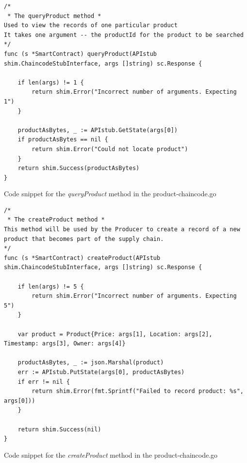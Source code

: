 \documentclass[
  a4paper,  %
  twoside,  %
  bibliography=totoc,
  headsepline,
  cleardoublepage=empty,
  parskip=half,
  draft=false
]{scrbook}
\begin{document}

\begin{Listing}[h!]
\begin{lstlisting}
/*
 * The queryProduct method *
Used to view the records of one particular product
It takes one argument -- the productId for the product to be searched
*/
func (s *SmartContract) queryProduct(APIstub shim.ChaincodeStubInterface, args []string) sc.Response {

	if len(args) != 1 {
		return shim.Error("Incorrect number of arguments. Expecting 1")
	}

	productAsBytes, _ := APIstub.GetState(args[0])
	if productAsBytes == nil {
		return shim.Error("Could not locate product")
	}
	return shim.Success(productAsBytes)
}
\end{lstlisting}
\caption{Code snippet for the \textit{queryProduct} method in the product-chaincode.go}
\label{lst:queryPId}
\end{Listing}
\begin{Listing}[h!]
\begin{lstlisting}
/*
 * The createProduct method *
This method will be used by the Producer to create a record of a new product that becomes part of the supply chain.
*/
func (s *SmartContract) createProduct(APIstub shim.ChaincodeStubInterface, args []string) sc.Response {

	if len(args) != 5 {
		return shim.Error("Incorrect number of arguments. Expecting 5")
	}

	var product = Product{Price: args[1], Location: args[2], Timestamp: args[3], Owner: args[4]}

	productAsBytes, _ := json.Marshal(product)
	err := APIstub.PutState(args[0], productAsBytes)
	if err != nil {
		return shim.Error(fmt.Sprintf("Failed to record product: %s", args[0]))
	}

	return shim.Success(nil)
}
\end{lstlisting}
\caption{Code snippet for the \textit{createProduct} method in the product-chaincode.go}
\label{lst:create}
\end{Listing}
\end{document}
